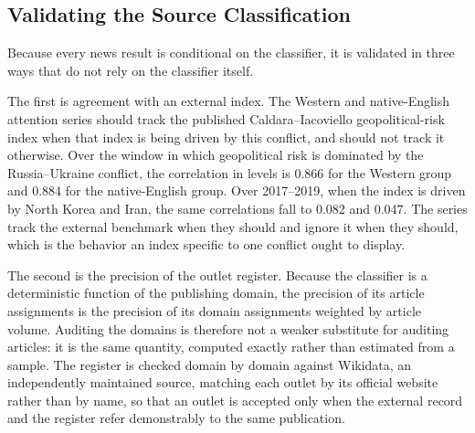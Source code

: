 \documentclass[12pt,a4paper]{article}
\begin{document}
\subsection{Validating the Source Classification}
\label{sec:classcheck}

Because every news result is conditional on the classifier, it is validated in three ways that do not rely on the classifier itself.

The first is agreement with an external index. The Western and native-English attention series should track the published Caldara--Iacoviello geopolitical-risk index when that index is being driven by this conflict, and should not track it otherwise. Over the window in which geopolitical risk is dominated by the Russia--Ukraine conflict, the correlation in levels is 0.866 for the Western group and 0.884 for the native-English group. Over 2017--2019, when the index is driven by North Korea and Iran, the same correlations fall to 0.082 and 0.047. The series track the external benchmark when they should and ignore it when they should, which is the behavior an index specific to one conflict ought to display.

The second is the precision of the outlet register. Because the classifier is a deterministic function of the publishing domain, the precision of its article assignments is the precision of its domain assignments weighted by article volume. Auditing the domains is therefore not a weaker substitute for auditing articles: it is the same quantity, computed exactly rather than estimated from a sample. The register is checked domain by domain against Wikidata, an independently maintained source, matching each outlet by its official website rather than by name, so that an outlet is accepted only when the external record and the register refer demonstrably to the same publication.
\end{document}
